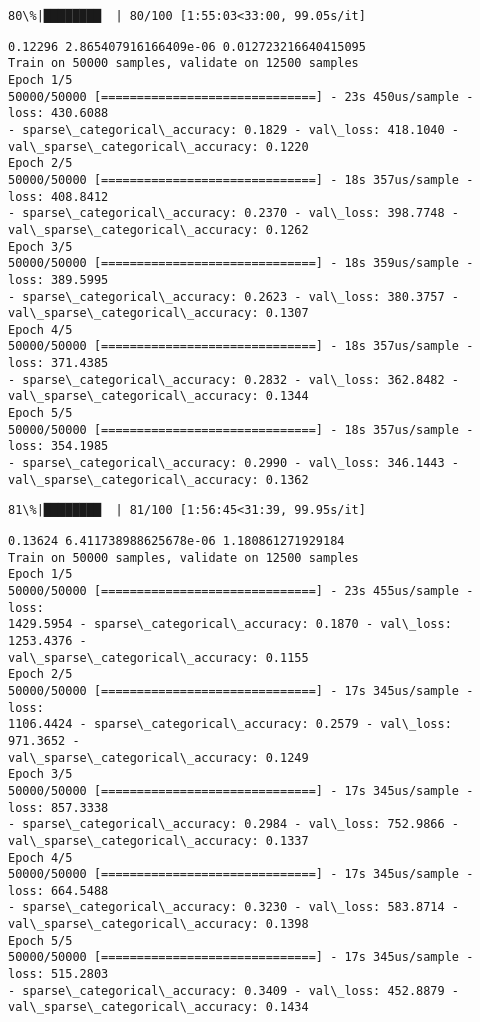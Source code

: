 \documentclass[11pt]{article}
\begin{document}
    \begin{Verbatim}[commandchars=\\\{\}]
 80\%|████████  | 80/100 [1:55:03<33:00, 99.05s/it]
    \end{Verbatim}

    \begin{Verbatim}[commandchars=\\\{\}]
0.12296 2.865407916166409e-06 0.012723216640415095
Train on 50000 samples, validate on 12500 samples
Epoch 1/5
50000/50000 [==============================] - 23s 450us/sample - loss: 430.6088
- sparse\_categorical\_accuracy: 0.1829 - val\_loss: 418.1040 -
val\_sparse\_categorical\_accuracy: 0.1220
Epoch 2/5
50000/50000 [==============================] - 18s 357us/sample - loss: 408.8412
- sparse\_categorical\_accuracy: 0.2370 - val\_loss: 398.7748 -
val\_sparse\_categorical\_accuracy: 0.1262
Epoch 3/5
50000/50000 [==============================] - 18s 359us/sample - loss: 389.5995
- sparse\_categorical\_accuracy: 0.2623 - val\_loss: 380.3757 -
val\_sparse\_categorical\_accuracy: 0.1307
Epoch 4/5
50000/50000 [==============================] - 18s 357us/sample - loss: 371.4385
- sparse\_categorical\_accuracy: 0.2832 - val\_loss: 362.8482 -
val\_sparse\_categorical\_accuracy: 0.1344
Epoch 5/5
50000/50000 [==============================] - 18s 357us/sample - loss: 354.1985
- sparse\_categorical\_accuracy: 0.2990 - val\_loss: 346.1443 -
val\_sparse\_categorical\_accuracy: 0.1362
    \end{Verbatim}

    \begin{Verbatim}[commandchars=\\\{\}]
 81\%|████████  | 81/100 [1:56:45<31:39, 99.95s/it]
    \end{Verbatim}

    \begin{Verbatim}[commandchars=\\\{\}]
0.13624 6.411738988625678e-06 1.180861271929184
Train on 50000 samples, validate on 12500 samples
Epoch 1/5
50000/50000 [==============================] - 23s 455us/sample - loss:
1429.5954 - sparse\_categorical\_accuracy: 0.1870 - val\_loss: 1253.4376 -
val\_sparse\_categorical\_accuracy: 0.1155
Epoch 2/5
50000/50000 [==============================] - 17s 345us/sample - loss:
1106.4424 - sparse\_categorical\_accuracy: 0.2579 - val\_loss: 971.3652 -
val\_sparse\_categorical\_accuracy: 0.1249
Epoch 3/5
50000/50000 [==============================] - 17s 345us/sample - loss: 857.3338
- sparse\_categorical\_accuracy: 0.2984 - val\_loss: 752.9866 -
val\_sparse\_categorical\_accuracy: 0.1337
Epoch 4/5
50000/50000 [==============================] - 17s 345us/sample - loss: 664.5488
- sparse\_categorical\_accuracy: 0.3230 - val\_loss: 583.8714 -
val\_sparse\_categorical\_accuracy: 0.1398
Epoch 5/5
50000/50000 [==============================] - 17s 345us/sample - loss: 515.2803
- sparse\_categorical\_accuracy: 0.3409 - val\_loss: 452.8879 -
val\_sparse\_categorical\_accuracy: 0.1434
    \end{Verbatim}
\end{document}
